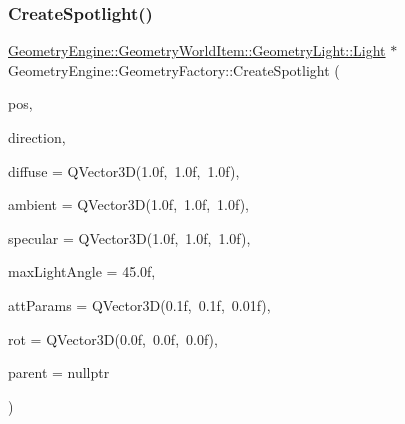 \subsubsection{\texorpdfstring{CreateSpotlight()}{CreateSpotlight()}}
{\footnotesize\ttfamily \mbox{\hyperlink{class_geometry_engine_1_1_geometry_world_item_1_1_geometry_light_1_1_light}{Geometry\+Engine\+::\+Geometry\+World\+Item\+::\+Geometry\+Light\+::\+Light}} $\ast$ Geometry\+Engine\+::\+Geometry\+Factory\+::\+Create\+Spotlight (\begin{DoxyParamCaption}\item[{const Q\+Vector3D \&}]{pos,  }\item[{const Q\+Vector3D \&}]{direction,  }\item[{const Q\+Vector3D \&}]{diffuse = {\ttfamily QVector3D(1.0f,~1.0f,~1.0f)},  }\item[{const Q\+Vector3D \&}]{ambient = {\ttfamily QVector3D(1.0f,~1.0f,~1.0f)},  }\item[{const Q\+Vector3D \&}]{specular = {\ttfamily QVector3D(1.0f,~1.0f,~1.0f)},  }\item[{float}]{max\+Light\+Angle = {\ttfamily 45.0f},  }\item[{const Q\+Vector3D \&}]{att\+Params = {\ttfamily QVector3D(0.1f,~0.1f,~0.01f)},  }\item[{const Q\+Vector3D \&}]{rot = {\ttfamily QVector3D(0.0f,~0.0f,~0.0f)},  }\item[{\mbox{\hyperlink{class_geometry_engine_1_1_geometry_world_item_1_1_world_item}{Geometry\+World\+Item\+::\+World\+Item}} $\ast$}]{parent = {\ttfamily nullptr} }\end{DoxyParamCaption})\hspace{0.3cm}{\ttfamily [static]}}

